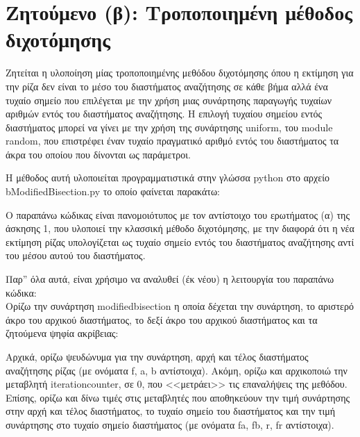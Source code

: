 \documentclass[a4paper,11pt]{article}
\newcommand{\lt}{\latintext}
\newcommand{\gt}{\greektext}
\begin{document}
\section{Ζητούμενο (β): Τροποποιημένη μέθοδος διχοτόμησης}
Ζητείται η υλοποίηση μίας τροποποιημένης μεθόδου διχοτόμησης όπου η εκτίμηση για την ρίζα δεν είναι το μέσο του
διαστήματος αναζήτησης σε κάθε βήμα αλλά ένα τυχαίο σημείο που επιλέγεται με την χρήση μιας
συνάρτησης παραγωγής τυχαίων αριθμών εντός του διαστήματος αναζήτησης. Η επιλογή τυχαίου σημείου εντός διαστήματος μπορεί να γίνει με την χρήση της συνάρτησης {\lt uniform}, του {\lt module random}, που επιστρέφει έναν τυχαίο πραγματικό αριθμό εντός του διαστήματος τα άκρα του οποίου που δίνονται ως παράμετροι.

Η μέθοδος αυτή υλοποιείται προγραμματιστικά στην γλώσσα {\lt python} στο αρχείο {\lt b\textunderscore Modified\textunderscore Bisection.py} το οποίο φαίνεται παρακάτω:

\lt

\gt

Ο παραπάνω κώδικας είναι πανομοιότυπος με τον αντίστοιχο του ερωτήματος (α) της άσκησης 1, που υλοποιεί την κλασσική μέθοδο διχοτόμησης, με την διαφορά ότι η νέα εκτίμηση ρίζας υπολογίζεται ως τυχαίο σημείο εντός του διαστήματος αναζήτησης αντί του μέσου αυτού του διαστήματος.

Παρ'' όλα αυτά, είναι χρήσιμο να αναλυθεί (έκ νέου) η λειτουργία του παραπάνω κώδικα:
\\
Oρίζω την συνάρτηση {\lt modified\textunderscore bisection} η οποία δέχεται την συνάρτηση, το αριστερό άκρο του αρχικού διαστήματος, το δεξί άκρο του αρχικού διαστήματος και τα ζητούμενα ψηφία ακρίβειας:\par
Αρχικά, ορίζω ψευδώνυμα για την συνάρτηση, αρχή και τέλος διαστήματος αναζήτησης ρίζας (με ονόματα {\lt f, a, b} αντίστοιχα).
Ακόμη, ορίζω και αρχικοποιώ την μεταβλητή {\lt iteration\textunderscore counter}, σε 0,  που <<μετράει>> τις επαναλήψεις της μεθόδου.
Επίσης, ορίζω και δίνω τιμές στις μεταβλητές που αποθηκεύουν την τιμή συνάρτησης στην αρχή και τέλος διαστήματος, το τυχαίο σημείο του διαστήματος και την τιμή συνάρτησης στο τυχαίο σημείο διαστήματος (με ονόματα {\lt fa, fb, r, fr} αντίστοιχα). 
\end{document}
